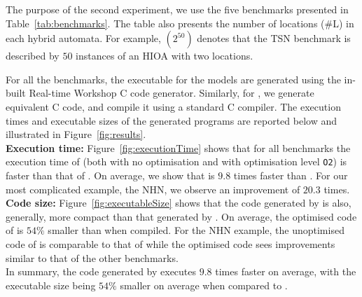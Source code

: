 The purpose of the second experiment, we use the five benchmarks
presented in Table~\ref{tab:benchmarks}.  The table also presents the
number of locations (\#L) in each hybrid automata.  For example,
$(2^{50})$ denotes that the \acf{TSN} benchmark is described by $50$
instances of an \ac{HIOA} with two locations.

For all the benchmarks, the executable for the \simulink models are
generated using the in-built Real-time
Workshop\textsuperscript{\textregistered} C code generator.  Similarly,
for \ourTool, we generate equivalent C code, and compile it using a
standard C compiler.
The execution times and executable sizes of the generated programs are reported below and illustrated in Figure~\ref{fig:results}.\\

\textbf{Execution time:} Figure~\ref{fig:executionTime} shows that for
all benchmarks the execution time of \ourTool (both with no optimisation
and with optimisation level \texttt{O2}) is faster than that of
\simulink.  On average, we show that \ourTool is $9.8$ times faster than
\simulink.
For our most complicated example, the \ac{NHN}, we observe an improvement of 
$20.3$ times.\\

\textbf{Code size:} Figure~\ref{fig:executableSize} shows that the code
generated by \ourTool is also, generally, more compact than that
generated by \simulink.  On average, the optimised code of \ourTool is
$54\%$ smaller than \simulink when compiled.
For the \ac{NHN} example, the unoptimised code of \ourTool is comparable to 
that of \simulink while the optimised code sees improvements similar to that of 
the other benchmarks.\\

In summary, the code generated by \ourTool executes $9.8$ times faster
on average, with the executable size being $54\%$ smaller on average
when compared to \simulink.  \ 



